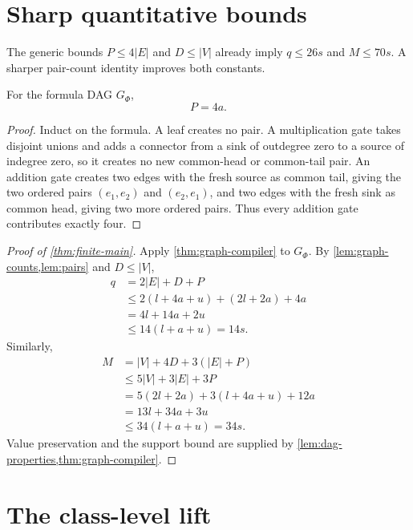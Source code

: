 \section{Sharp quantitative bounds}\label{sec:counts}

The generic bounds \(P\le 4|E|\) and \(D\le |V|\) already imply
\(q\le26s\) and \(M\le70s\).  A sharper pair-count identity improves both constants.

\begin{lemma}\label{lem:pairs}
For the formula DAG \(G_\Phi\),
\[
  P=4a.
\]
\end{lemma}

\begin{proof}
Induct on the formula.  A leaf creates no pair.  A multiplication gate takes disjoint
unions and adds a connector from a sink of outdegree zero to a source of indegree zero, so
it creates no new common-head or common-tail pair.  An addition gate creates two edges
with the fresh source as common tail, giving the two ordered pairs \((e_1,e_2)\) and
\((e_2,e_1)\), and two edges with the fresh sink as common head, giving two more ordered
pairs.  Thus every addition gate contributes exactly four.
\end{proof}

\begin{proof}[Proof of \cref{thm:finite-main}]
Apply \cref{thm:graph-compiler} to \(G_\Phi\).  By
\cref{lem:graph-counts,lem:pairs} and \(D\le|V|\),
\begin{align*}
 q
 &=2|E|+D+P\\
 &\le 2(l+4a+u)+(2l+2a)+4a\\
 &=4l+14a+2u\\
 &\le14(l+a+u)=14s.
\end{align*}
Similarly,
\begin{align*}
 M
 &=|V|+4D+3(|E|+P)\\
 &\le5|V|+3|E|+3P\\
 &=5(2l+2a)+3(l+4a+u)+12a\\
 &=13l+34a+3u\\
 &\le34(l+a+u)=34s.
\end{align*}
Value preservation and the support bound are supplied by
\cref{lem:dag-properties,thm:graph-compiler}.
\end{proof}

\section{The class-level lift}\label{sec:class}

